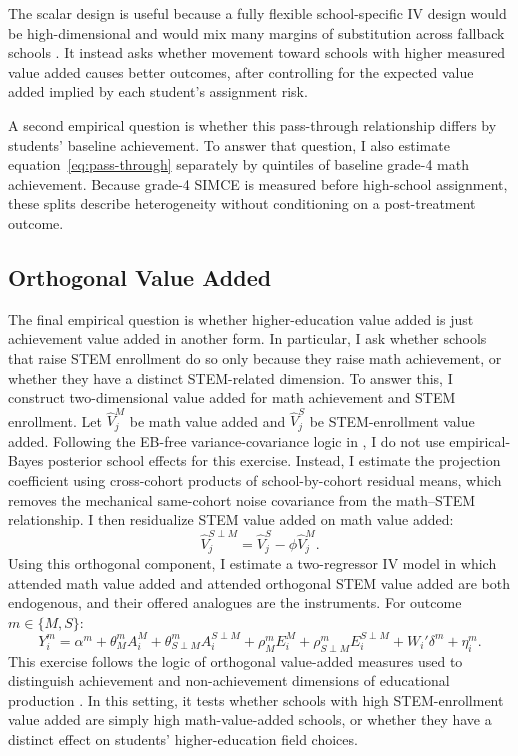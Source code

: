 \documentclass[a4paper, article, english, oneside, unknownkeysallowed, 12pt]{memoir}
\begin{document}
The scalar design is useful because a fully flexible school-specific IV design would be high-dimensional and would mix many margins of substitution across fallback schools \parencite{angrist_methods_2023, kirkeboen_field_2016}.
It instead asks whether movement toward schools with higher measured value added causes better outcomes, after controlling for the expected value added implied by each student's assignment risk.

A second empirical question is whether this pass-through relationship differs by students' baseline achievement.
To answer that question, I also estimate equation~\eqref{eq:pass-through} separately by quintiles of baseline grade-4 math achievement.
Because grade-4 SIMCE is measured before high-school assignment, these splits describe heterogeneity without conditioning on a post-treatment outcome.

\subsection{Orthogonal Value Added}

The final empirical question is whether higher-education value added is just achievement value added in another form.
In particular, I ask whether schools that raise STEM enrollment do so only because they raise math achievement, or whether they have a distinct STEM-related dimension.
To answer this, I construct two-dimensional value added for math achievement and STEM enrollment.
Let $\widehat{V}_j^{M}$ be math value added and $\widehat{V}_j^{S}$ be STEM-enrollment value added.
Following the EB-free variance-covariance logic in \textcite{rose_effects_2022}, I do not use empirical-Bayes posterior school effects for this exercise.
Instead, I estimate the projection coefficient using cross-cohort products of school-by-cohort residual means, which removes the mechanical same-cohort noise covariance from the math--STEM relationship.
I then residualize STEM value added on math value added:
\begin{equation}
  \widehat{V}_{j}^{S \perp M}
  =
  \widehat{V}_{j}^{S}
  -
  \widehat{\phi}\widehat{V}_{j}^{M}.
  \label{eq:orthogonal-va}
\end{equation}
Using this orthogonal component, I estimate a two-regressor IV model in which attended math value added and attended orthogonal STEM value added are both endogenous, and their offered analogues are the instruments.
For outcome $m \in \{M,S\}$:
\begin{equation}
  Y_i^m =
  \alpha^m
  + \theta_M^m A_i^M
  + \theta_{S\perp M}^m A_i^{S\perp M}
  + \rho_M^m E_i^M
  + \rho_{S\perp M}^m E_i^{S\perp M}
  + W_i'\delta^m
  + \eta_i^m.
  \label{eq:orthogonal-iv}
\end{equation}
This exercise follows the logic of orthogonal value-added measures used to distinguish achievement and non-achievement dimensions of educational production \parencite{jackson_what_2018, rose_effects_2022}.
In this setting, it tests whether schools with high STEM-enrollment value added are simply high math-value-added schools, or whether they have a distinct effect on students' higher-education field choices.
\end{document}
